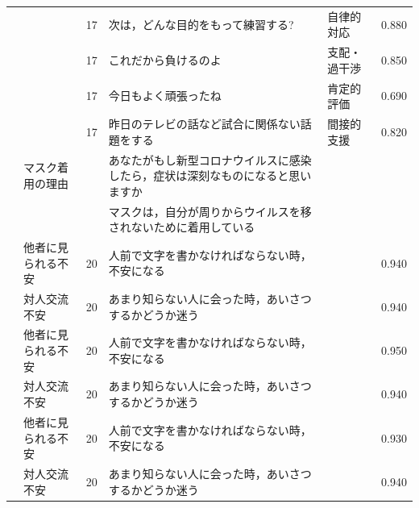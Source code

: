 \begin{landscape}
\begin{longtable}{p{2cm}p{2cm}p{2cm}p{6cm}p{2cm}p{2cm}}
		                         &                                  & 17  & 次は，どんな目的をもって練習する?                                   & 自律的対応                & 0.880      \\
		                         &                                  & 17  & これだから負けるのよ                                          & 支配・過干渉               & 0.850      \\
		                         &                                  & 17  & 今日もよく頑張ったね                                          & 肯定的評価                & 0.690      \\
		                         &                                  & 17  & 昨日のテレビの話など試合に関係ない話題をする                              & 間接的支援                & 0.820      \\
		\textcite{Sakakibara202192} & マスク着用の理由                         &     & あなたがもし新型コロナウイルスに感染したら，症状は深刻なものになると思いますか             &                      &            \\
		                         &                                  &     & マスクは，自分が周りからウイルスを移されないために着用している                     &                      &            \\
		\textcite{Miyazaki202192}   & 他者に見られる不安                        & 20  & 人前で文字を書かなければならない時，不安になる                             &                      & 0.940      \\
		                         & 対人交流不安                           & 20  & あまり知らない人に会った時，あいさつするかどうか迷う                          &                      & 0.940      \\
		                         & 他者に見られる不安                        & 20  & 人前で文字を書かなければならない時，不安になる                             &                      & 0.950      \\
		                         & 対人交流不安                           & 20  & あまり知らない人に会った時，あいさつするかどうか迷う                          &                      & 0.940      \\
		                         & 他者に見られる不安                        & 20  & 人前で文字を書かなければならない時，不安になる                             &                      & 0.930      \\
		                         & 対人交流不安                           & 20  & あまり知らない人に会った時，あいさつするかどうか迷う                          &                      & 0.940      \\

\end{longtable}
\end{landscape}

